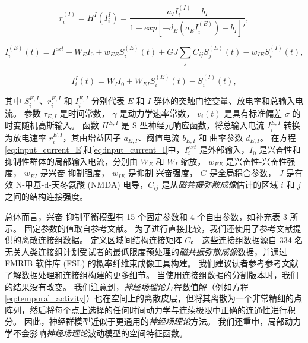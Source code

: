 \documentclass[lang=cn,a4paper,newtx]{elegantpaper}
\begin{document}
\begin{equation}\label{eq:firing_rate_I}
	r_i^{(I)} = H^{I} (I_i^{I}) = \frac{a_I I_i^{(I)} - b_I}{1 - exp[-d_E (a_E I_i^{(E)}) - b_I]'},
\end{equation}

\begin{equation}\label{eq:input_current_E}
	I_i^{(E)}(t) = I^{ext} + W_E I_0 + w_{EE} S_i^{(E)} (t) + G J \sum_j C_{ij} S_j^{(E)}(t) - w_{IE} S_i^{(I)} (t), 
\end{equation}

\begin{equation}\label{eq:input_current_I}
	I_i^{I} (t) = W_I I_0 +
				  W_{EI} S_i^{(E)} (t) - 
				  S_i^{(I)} (t),
\end{equation}

其中 $ S_i^{E,I} $、$ r_i^{E, I} $ 和 $ I_i^{E, I} $ 分别代表 $ E $ 和 $ I $ 群体的突触门控变量、放电率和总输入电流。
参数 $ \tau_{E,I} $ 是时间常数，
$ \gamma $ 是动力学速率常数，
$ v_i (t) $ 是具有标准偏差 $ \sigma $ 的时变随机高斯输入。
函数 $ H^{E,I} $ 是 S 型神经元响应函数，将总输入电流 $ I_i^{E,I} $ 转换为放电速率 $ r_i^{E,I} $，其由增益因子 $ a_{E,I} $、阈值电流 $ b_{E,I} $ 和 曲率参数 $ d_{E,I} $。
在方程\ref{eq:input_current_E}和\ref{eq:input_current_I}中，$ I_i^{ext} $ 是外部输入，$ I_0 $ 是兴奋性和抑制性群体的局部输入电流，分别由 $ W_E $ 和 $ W_I $ 缩放，
$ w_{EE} $ 是兴奋性-兴奋性强度，
$ w_{EI} $ 是兴奋-抑制强度，
$ w_{IE} $ 是抑制-兴奋强度，
$ G $ 是全局耦合参数，
$ J $ 是有效 N-甲基-d-天冬氨酸 (NMDA) 电导，$ C_{ij} $ 是从\textit{磁共振弥散成像}估计的区域 $ i $ 和 $ j $ 之间的结构连接强度。


总体而言，兴奋-抑制平衡模型有 15 个固定参数和 4 个自由参数，如补充表 3 所示。
固定参数的值取自参考文献\cite{demirtacs2019hierarchical}。
为了进行直接比较，我们还使用了参考文献\cite{demirtacs2019hierarchical}提供的离散连接组数据。
定义区域间结构连接矩阵 $ C $。
这些连接组数据源自 334 名无关人类连接组计划受试者的最低限度预处理的\textit{磁共振弥散成像}数据，并通过 FMRIB 软件库 (FSL)\cite{behrens2003characterization} 的概率纤维束成像工具构建。 
我们建议读者参考参考文献\cite{demirtacs2019hierarchical}了解数据处理和连接组构建的更多细节。
当使用连接组数据的分割版本时，我们的结果没有改变。
我们注意到，\textit{神经场理论}方程数值解（例如方程\ref{eq:temporal_activity}）也在空间上的离散皮层，但将其离散为一个非常精细的点阵列，然后将每个点上选择的任何时间动力学与连续极限中正确的连通性进行积分。
因此，神经群模型近似于更通用的\textit{神经场理论}方法\cite{deco2008dynamic,spiegler2013systematic}。 
我们还重申，局部动力学不会影响\textit{神经场理论}波动模型的空间特征函数。
\end{document}
